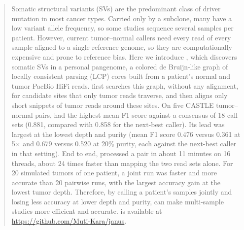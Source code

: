 \begin{abstract}
Somatic structural variants (SVs) are the predominant class of driver mutation in most cancer types.
Carried only by a subclone, many have a low variant allele frequency, so some studies sequence several samples per patient.
However, current tumor--normal callers need every read of every sample aligned to a single reference genome, so they are computationally expensive and prone to reference bias.
Here we introduce \tool{}, which discovers somatic SVs in a personal pangenome, a colored de Bruijn-like graph of locally consistent parsing (LCP) cores built from a patient's normal and tumor PacBio HiFi reads.
\tool{} first searches this graph, without any alignment, for candidate sites that only tumor reads traverse, and then aligns only short snippets of tumor reads around these sites.
On five CASTLE tumor--normal pairs, \tool{} had the highest mean F1 score against a consensus of 18 call sets (0.881, compared with 0.858 for the next-best caller).
Its lead was largest at the lowest depth and purity (mean F1 score 0.476 versus 0.361 at 5$\times$ and 0.679 versus 0.520 at 20\% purity, each against the next-best caller in that setting).
End to end, \tool{} processed a pair in about 11 minutes on 16 threads, about 24 times faster than mapping the two read sets alone.
For 20 simulated tumors of one patient, a joint run was faster and more accurate than 20 pairwise runs, with the largest accuracy gain at the lowest tumor depth.
Therefore, by calling a patient's samples jointly and losing less accuracy at lower depth and purity, \tool{} can make multi-sample studies more efficient and accurate.
\tool{} is available at \url{https://github.com/Muti-Kara/janus}.
\end{abstract}
